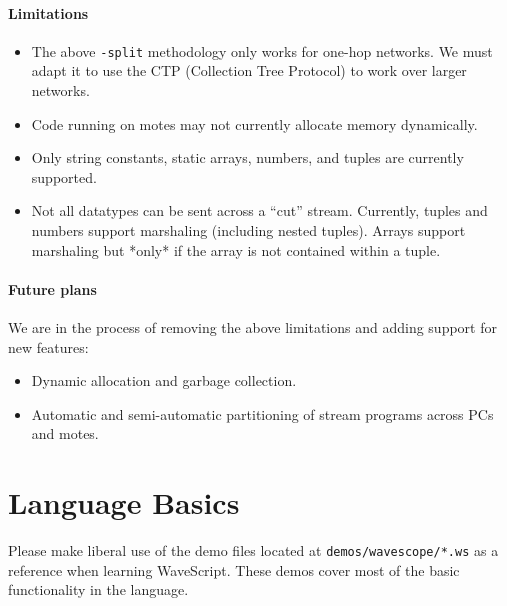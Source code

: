 \documentclass[twocolumn]{report}
\begin{document}
\subsubsection*{Limitations}

\begin{itemize}
\item The above {\tt -split} methodology only works for
  one-hop networks.  We must adapt it to use the CTP (Collection
  Tree Protocol) to work over larger networks.
\item Code running on motes may not currently allocate memory
  dynamically.
\item Only string constants, static arrays, numbers, and tuples are
  currently supported.
\item Not all datatypes can be sent across a ``cut'' stream.
  Currently, tuples and numbers support marshaling (including nested
  tuples).  Arrays support marshaling but *only* if the array is not
  contained within a tuple.
\end{itemize}

\subsubsection*{Future plans}

We are in the process of removing the above limitations and adding
support for new features:

\begin{itemize}
\item Dynamic allocation and garbage collection.
\item Automatic and semi-automatic partitioning of stream programs
  across PCs and motes.
\end{itemize}


\chapter{Language Basics}\label{s:lang}

Please make liberal use of the demo files located at {\tt demos/wavescope/*.ws} as a reference
when learning WaveScript.  These demos cover most of the basic
functionality in the language.

\end{document}
